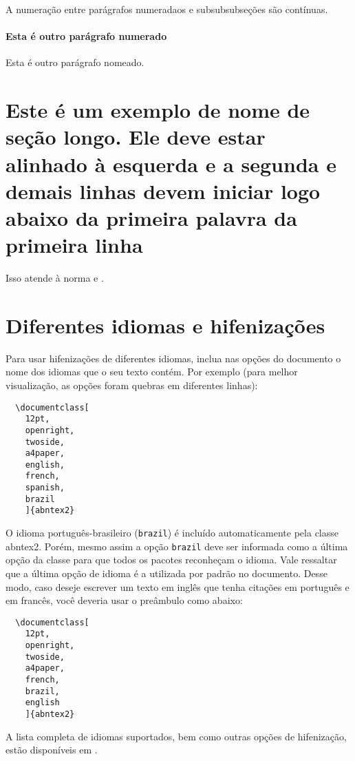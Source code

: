 A numeração entre parágrafos numeradaos e subsubsubseções são contínuas.

\paragraph{Esta é outro parágrafo numerado}\label{sec-exemplo-paragrafo-outro}

Esta é outro parágrafo nomeado.

\section{Este é um exemplo de nome de seção longo. Ele deve estar alinhado à esquerda e a segunda e demais linhas devem iniciar logo abaixo da primeira palavra da primeira linha}
Isso atende à norma  e .

\section{Diferentes idiomas e hifenizações}
\label{sec-hifenizacao}
Para usar hifenizações de diferentes idiomas, inclua nas opções do documento o nome dos idiomas que o seu texto contém. Por exemplo (para melhor visualização, as opções foram quebras em diferentes linhas):

\begin{verbatim}
  \documentclass[
	12pt,
	openright,
	twoside,
	a4paper,
	english,
	french,
	spanish,
	brazil
	]{abntex2}
\end{verbatim}

O idioma português-brasileiro (\texttt{brazil}) é incluído automaticamente pela classe \textsf{abntex2}. Porém, mesmo assim a opção \texttt{brazil} deve ser informada como a última opção da classe para que todos os pacotes reconheçam o idioma. Vale ressaltar que a última opção de idioma é a utilizada por padrão no documento. Desse modo, caso deseje escrever um texto em inglês que tenha citações em português e em francês, você deveria usar o preâmbulo como abaixo:

\begin{verbatim}
  \documentclass[
  	12pt,
  	openright,
  	twoside,
  	a4paper,
  	french,
  	brazil,
  	english
  	]{abntex2}
\end{verbatim}

A lista completa de idiomas suportados, bem como outras opções de hifenização, estão disponíveis em .


